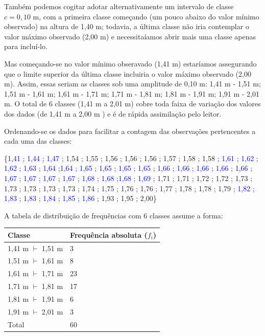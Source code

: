 \documentclass[
]{book}
\begin{document}
\hfill\break

Também podemos cogitar adotar alternativamente um intervalo de classe \(c=0,10\) m, com a primeira classe começando (um pouco abaixo do valor mínimo observado) na altura de 1,40 m; todavia, a última classe não iria contemplar o valor máximo observado (2,00 m) e necessitaíamos abrir mais uma classe apenas para incluí-lo.

\hfill\break

Mas começando-se no valor mínimo obseravado (1,41 m) estaríamos assegurando que o limite superior da última classe incluiria o valor máximo observado (2,00 m). Assim, essas seriam as classes sob uma amplitude de 0,10 m: 1,41 m - 1,51 m; 1,51 m - 1,61 m; 1,61 m - 1,71 m; 1,71 m - 1,81 m; 1,81 m - 1,91 m; 1,91 m - 2,01 m. O total de 6 classes (1,41 m a 2,01 m) cobre toda faixa de variação dos valores dos dados (de 1,41 m a 2,00 m ) e é de rápida assimilação pelo leitor.

\hfill\break

Ordenando-se os dados para facilitar a contagem das observações pertencentes a cada uma das classes:

\hfill\break

\{\textcolor{blue}{1,41 ; 1,44 ; 1,47 ;} 1,54 ; 1,55 ; 1,56 ; 1,56 ; 1,56 ; 1,57 ; 1,58 ; 1,58 ; \textcolor{blue}{1,61 ; 1,62 ; 1,62 ; 1,63 ; 1,64 ;1,64 ; 1,65 ; 1,65 ; 1,65 ; 1,65 ; 1,66 ; 1,66 ; 1,66 ; 1,66 ; 1,66 ; 1,67 ; 1,67 ; 1,67 ; 1,67 ; 1,68 ; 1,68 ;1,68 ; 1,69 ;} 1,71 ; 1,71 ; 1,72 ; 1,72 ; 1,73 ; 1,73 ; 1,73 ; 1,73 ; 1,73 ; 1,74 ; 1,75 ; 1,76 ; 1,76 ; 1,77 ; 1,78 ; 1,78 ; 1,79 ; \textcolor{blue}{1,82 ; 1,83 ; 1,83 ; 1,84 ; 1,85 ; 1,86 ;} 1,93 ; 1,95 ; 2,00\}

\hfill\break

A tabela de distribuição de frequências com 6 classes assume a forma:

\hfill\break

\begin{longtable}[]{@{}ll@{}}
\toprule()
Classe & Frequência absoluta (\(f_{i}\)) \\
\midrule()
\endhead
1,41 m \(\vdash\) 1,51 m & 3 \\
1,51 m \(\vdash\) 1,61 m & 8 \\
1,61 m \(\vdash\) 1,71 m & 23 \\
1,71 m \(\vdash\) 1,81 m & 17 \\
1,81 m \(\vdash\) 1,91 m & 6 \\
1,91 m \(\vdash\) 2,01 m & 3 \\
Total & 60 \\
\bottomrule()
\end{longtable}
\end{document}
